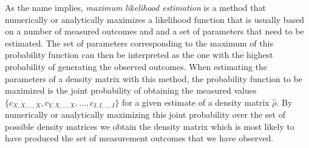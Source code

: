 As the name implies, {\it maximum likelihood estimation} is a method that numerically or analytically maximizes a likelihood function that is usually based on a number of measured outcomes and and a set of parameters that need to be estimated. The set of parameters corresponding to the maximum of this probability function can then be interpreted as the one with the highest probability of generating the observed outcomes. When estimating the parameters of a density matrix with this method, the probability function to be maximized is the joint probability of obtaining the measured values $\{c_{X,X,\hdots,X},c_{Y,X,\hdots,X},\hdots,c_{I,I,\hdots,I}\}$ for a given estimate of a density matrix $\hat{\rho}$. By numerically or analytically maximizing this joint probability over the set of possible density matrices we obtain the density matrix which is most likely to have produced the set of measurement outcomes that we have observed.

